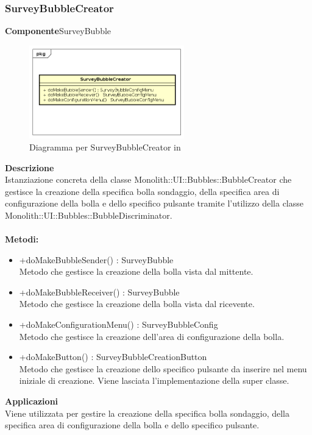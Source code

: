 \subsubsection{SurveyBubbleCreator}
\textbf{Componente}SurveyBubble\\
   \FloatBarrier
   \begin{figure}[ht]
   \centering
   \includegraphics[width=0.6\textwidth]{img/single-SurveyBubbleCreator}
   \caption{{Diagramma per SurveyBubbleCreator in }}
\end{figure}
\FloatBarrier
\textbf{Descrizione}\\
Istanziazione concreta della classe Monolith::UI::Bubbles::BubbleCreator che gestisce la creazione della specifica bolla sondaggio, della specifica area di configurazione della bolla e dello specifico pulsante tramite l'utilizzo della classe Monolith::UI::Bubbles::BubbleDiscriminator.
\\
\\
\textbf{Metodi:} 
\begin{itemize}
\item +doMakeBubbleSender() : SurveyBubble 
\\
Metodo che gestisce la creazione della bolla vista dal mittente.
\item +doMakeBubbleReceiver() : SurveyBubble 
\\
Metodo che gestisce la creazione della bolla vista dal ricevente.
\item +doMakeConfigurationMenu() : SurveyBubbleConfig 
\\
Metodo che gestisce la creazione dell'area di configurazione della bolla.
\item +doMakeButton() : SurveyBubbleCreationButton 
\\
Metodo che gestisce la creazione dello specifico pulsante da inserire nel menu iniziale di creazione. Viene lasciata l'implementazione della super classe.
\end{itemize} 


\textbf{Applicazioni}\\
Viene utilizzata per gestire la creazione della specifica bolla sondaggio, della specifica area di configurazione della bolla e dello specifico pulsante. 


